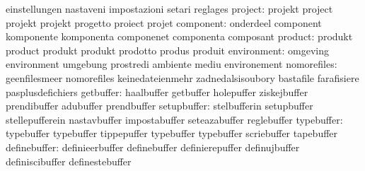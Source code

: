                                  einstellungen                    nastaveni
                                  impostazioni                     setari
                                  reglages
                         project: projekt                          project
                                  projekt                          projekt
                                  progetto                         proiect
                                  projet
                       component: onderdeel                        component
                                  komponente                       komponenta
                                  componenet                       componenta
                                  composant
                         product: produkt                          product
                                  produkt                          produkt
                                  prodotto                         produs
                                  produit
                     environment: omgeving                         environment
                                  umgebung                         prostredi
                                  ambiente                         mediu
                                  environement
                     nomorefiles: geenfilesmeer                    nomorefiles
                                  keinedateienmehr                 zadnedalsisoubory
                                  bastafile                        farafisiere
                                  pasplusdefichiers
                       getbuffer: haalbuffer                       getbuffer
                                  holepuffer                       ziskejbuffer
                                  prendibuffer                     adubuffer
                                  prendbuffer
                     setupbuffer: stelbufferin                     setupbuffer
                                  stellepufferein                  nastavbuffer
                                  impostabuffer                    seteazabuffer
                                  reglebuffer
                      typebuffer: typebuffer                       typebuffer
                                  tippepuffer                      typebuffer
                                  typebuffer                       scriebuffer
                                  tapebuffer
                    definebuffer: definieerbuffer                  definebuffer
                                  definierepuffer                  definujbuffer
                                  definiscibuffer                  definestebuffer
